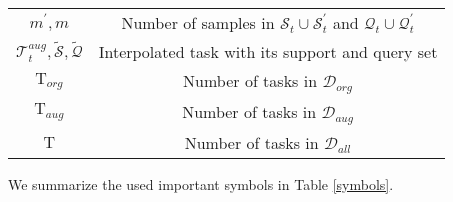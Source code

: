 \begin{table}[ht]
{\begin{tabular}{@{}c|c@{}}
    $m^\prime, m$ & Number of samples in $\mathcal{S}_t\cup\mathcal{S}_t^\prime$ and $\mathcal{Q}_t\cup\mathcal{Q}_t^\prime$ \\
    $\mathcal{T}_t^{aug}, \tilde{\mathcal{S}}, \tilde{\mathcal{Q}}$ & Interpolated task with its support and query set \\
    $\mathrm{T}_{org}$ & Number of tasks in $\mathcal{D}_{org}$ \\
    $\mathrm{T}_{aug}$ & Number of tasks in $\mathcal{D}_{aug}$ \\
    $\mathrm{T}$ & Number of tasks in $\mathcal{D}_{all}$ \\
    \bottomrule
\end{tabular} %
}
\end{table}

We summarize the used important symbols in Table \ref{symbols}.


